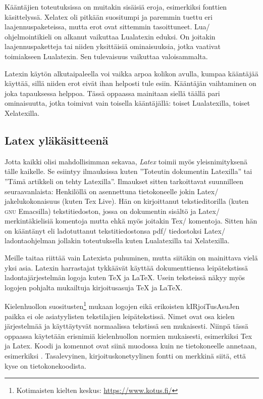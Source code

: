 Kääntäjien toteutuksissa on muitakin sisäisiä eroja, esimerkiksi
fonttien käsittelyssä. Xelatex oli pitkään suositumpi ja paremmin tuettu
eri laajennuspaketeissa, mutta erot ovat sittemmin tasoittuneet. Lua\-/
ohjelmointikieli on alkanut vaikuttaa Lualatexin eduksi. On joitakin
laajennuspaketteja tai niiden yksittäisiä ominaisuuksia, jotka vaativat
toimiakseen Lualatexin. Sen tulevaisuus vaikuttaa valoisammalta.

Latexin käytön alkutaipaleella voi vaikka arpoa kolikon avulla, kumpaa
kääntäjää käyttää, sillä niiden erot eivät ihan helposti tule esiin.
Kääntäjän vaihtaminen on joka tapauksessa helppoa. Tässä oppaassa
mainitaan siellä täällä pari ominaisuutta, jotka toimivat vain toisella
kääntäjällä: toiset Lualatexilla, toiset Xelatexilla.

\subsection{Latex yläkäsitteenä}

Jotta kaikki olisi mahdollisimman sekavaa, \emph{Latex} toimii myös
yleisnimityksenä tälle kaikelle. Se esiintyy ilmauksissa kuten
''Toteutin dokumentin Latexilla'' tai ''Tämä artikkeli on tehty
Latexilla''. Ilmaukset sitten tarkoittavat suunnilleen seuraavanlaista:
Henkilöllä on asennettuna tietokoneelle jokin Latex\-/ jakelukokonaisuus
(kuten Tex Live). Hän on kirjoittanut tekstieditorilla (kuten
\textsc{gnu} Emacsilla) tekstitiedoston, jossa on dokumentin sisältö ja
Latex\-/ merkintäkielisiä komentoja mutta ehkä myös joitakin Tex\-/
komentoja. Sitten hän on kääntänyt eli ladotuttanut tekstitiedostonsa
pdf\-/ tiedostoksi Latex\-/ ladontaohjelman jollakin toteutuksella kuten
Lualatexilla tai Xelatexilla.

Meille taitaa riittää vain Latexista puhuminen, mutta siitäkin on
mainittava vielä yksi asia. Latexin harrastajat tykkäävät käyttää
dokumenttiensa leipätekstissä ladontajärjestelmän logoja kuten \TeX{} ja
\LaTeX{}. Usein teksteissä näkyy myös logojen pohjalta mukailtuja
kirjoitusasuja TeX ja LaTeX.

Kielenhuollon suositusten\footnote{Kotimaisten kielten keskus:
  \url{https://www.kotus.fi/}} mukaan logojen eikä erikoisten
kIRjoiTusAsuJen paikka ei ole asiatyylisten tekstilajien leipätekstissä.
Nimet ovat osa kielen järjestelmää ja käyttäytyvät normaalissa tekstissä
sen mukaisesti. Niinpä tässä oppaassa käytetään erisnimiä kielenhuollon
normien mukaisesti, esimerkiksi Tex ja Latex. Koodi ja komennot ovat
siinä muodossa kuin ne tietokoneelle annetaan, esimerkiksi
. Tasalevyinen, kirjoituskonetyylinen fontti on merkkinä
siitä, että kyse on tietokonekoodista.

